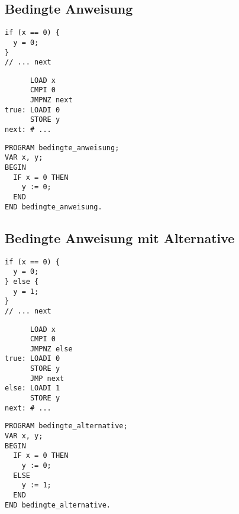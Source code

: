 \documentclass{lehramt-informatik-haupt}
\begin{document}
\subsection{Bedingte Anweisung}

\begin{multicols}{3}

\begin{verbatim}
if (x == 0) {
  y = 0;
}
// ... next
\end{verbatim}

\liSpaltenUmbruch
{}

\begin{verbatim}
      LOAD x
      CMPI 0
      JMPNZ next
true: LOADI 0
      STORE y
next: # ...
\end{verbatim}

\liSpaltenUmbruch
{}

\begin{verbatim}
PROGRAM bedingte_anweisung;
VAR x, y;
BEGIN
  IF x = 0 THEN
    y := 0;
  END
END bedingte_anweisung.
\end{verbatim}
\vfill\strut
\end{multicols}

%

\subsection{Bedingte Anweisung mit Alternative}

\begin{multicols}{3}


\begin{verbatim}
if (x == 0) {
  y = 0;
} else {
  y = 1;
}
// ... next
\end{verbatim}

\liSpaltenUmbruch


\begin{verbatim}
      LOAD x
      CMPI 0
      JMPNZ else
true: LOADI 0
      STORE y
      JMP next
else: LOADI 1
      STORE y
next: # ...
\end{verbatim}

\liSpaltenUmbruch
{}

\begin{verbatim}
PROGRAM bedingte_alternative;
VAR x, y;
BEGIN
  IF x = 0 THEN
    y := 0;
  ELSE
    y := 1;
  END
END bedingte_alternative.
\end{verbatim}
\vfill\strut
\end{multicols}
\end{document}
